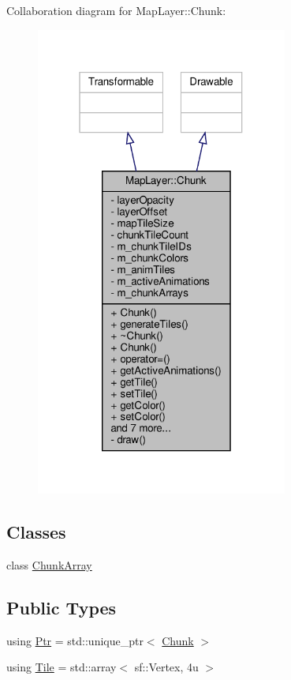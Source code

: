 Collaboration diagram for Map\+Layer\+:\+:Chunk\+:
\nopagebreak
\begin{figure}[H]
\begin{center}
\leavevmode
\includegraphics[width=235pt]{classMapLayer_1_1Chunk__coll__graph}
\end{center}
\end{figure}
\subsection*{Classes}
\begin{DoxyCompactItemize}
\item 
class \hyperlink{classMapLayer_1_1Chunk_1_1ChunkArray}{Chunk\+Array}
\end{DoxyCompactItemize}
\subsection*{Public Types}
\begin{DoxyCompactItemize}
\item 
using \hyperlink{classMapLayer_1_1Chunk_ab1df4d3621c5d9f83c2edb46d0744078}{Ptr} = std\+::unique\+\_\+ptr$<$ \hyperlink{classMapLayer_1_1Chunk}{Chunk} $>$
\item 
using \hyperlink{classMapLayer_1_1Chunk_a2137a288bfd4120eb3e4db5934b802f3}{Tile} = std\+::array$<$ sf\+::\+Vertex, 4u $>$
\end{DoxyCompactItemize}
